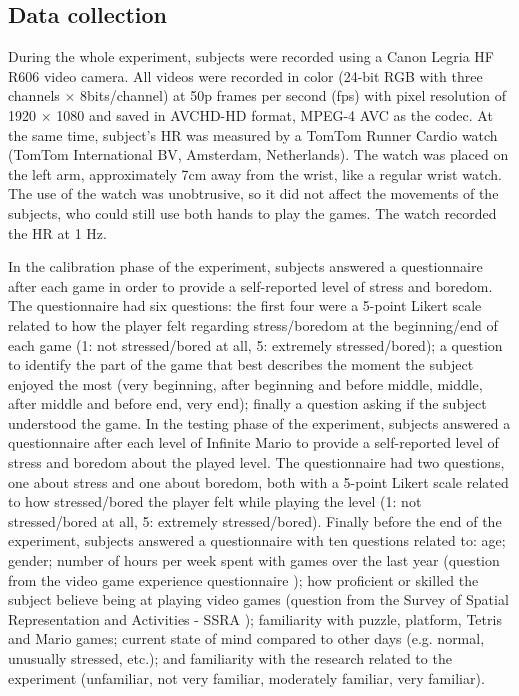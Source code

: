 \subsection{Data collection}

During the whole experiment, subjects were recorded using a Canon Legria HF R606 video camera. All videos were recorded in color (24-bit RGB with three channels $\times$ 8bits/channel) at 50p frames per second (fps) with pixel resolution of 1920 $\times$ 1080 and saved in AVCHD-HD format, MPEG-4 AVC as the codec. At the same time, subject's HR was measured by a TomTom Runner Cardio watch (TomTom International BV, Amsterdam, Netherlands). The watch was placed on the left arm, approximately 7cm away from the wrist, like a regular wrist watch. The use of the watch was unobtrusive, so it did not affect the movements of the subjects, who could still use both hands to play the games. The watch recorded the HR at 1 Hz.

In the calibration phase of the experiment, subjects answered a questionnaire after each game in order to provide a self-reported level of stress and boredom. The questionnaire had six questions: the first four were a 5-point Likert scale related to how the player felt regarding stress/boredom at the beginning/end of each game (1: not stressed/bored at all, 5: extremely stressed/bored); a question to identify the part of the game that best describes the moment the subject enjoyed the most (very beginning, after beginning and before middle, middle, after middle and before end, very end); finally a question asking if the subject understood the game. In the testing phase of the experiment, subjects answered a questionnaire after each level of Infinite Mario to provide a self-reported level of stress and boredom about the played level. The questionnaire had two questions, one about stress and one about boredom, both with a 5-point Likert scale related to how stressed/bored the player felt while playing the level (1: not stressed/bored at all, 5: extremely stressed/bored). Finally before the end of the experiment, subjects answered a questionnaire with ten questions related to: age; gender; number of hours per week spent with games over the last year (question from the video game experience questionnaire \parencite{unsworth2015playing}); how proficient or skilled the subject believe being at playing video games (question from the Survey of Spatial Representation and Activities - SSRA \parencite{terlecki2005important}); familiarity with puzzle, platform, Tetris and Mario games; current state of mind compared to other days (e.g. normal, unusually stressed, etc.); and familiarity with the research related to the experiment (unfamiliar, not very familiar, moderately familiar, very familiar).

